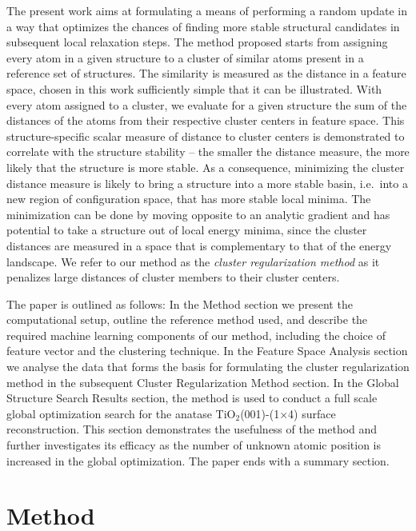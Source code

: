 \documentclass[aip,amsmath,amssymb,reprint]{revtex4-1}
\begin{document}
The present work aims at formulating a means of performing a random
update in a way that optimizes the chances of finding more stable
structural candidates in subsequent local relaxation steps. The method
proposed starts from assigning every atom in a given structure to a
cluster of similar atoms present in a reference set of structures.
The similarity is measured as the distance in a feature space, chosen in this work
sufficiently simple that it can be illustrated. With every atom
assigned to a cluster, we evaluate for a given structure the sum of
the distances of the atoms from their respective
cluster centers in feature space. This structure-specific scalar measure of distance to
cluster centers is demonstrated to correlate with the structure
stability -- the smaller the distance measure, the more likely that the
structure is more stable. As a consequence, minimizing the cluster distance measure
is likely to bring a structure into a more stable basin, i.e.\ into a new region of
configuration space, that has more stable local minima. The minimization
can be done by moving opposite to an analytic gradient and has
potential to take a structure out of local energy minima, since the
cluster distances are measured in a space that is complementary to that of the
energy landscape. We refer to our method as the
\textit{cluster regularization method} as it penalizes large
distances of cluster members to their cluster centers.

The paper is outlined as follows: In the Method section we present
the computational setup, outline the reference method used, and
describe the required machine learning components of our method,
including the choice of feature vector and the clustering technique.
In the Feature Space Analysis section we analyse the data that forms the basis for formulating the cluster
regularization method in the subsequent Cluster Regularization Method section. In the Global Structure Search Results
section, the method is used to conduct a full scale global optimization 
search for the anatase TiO$_2$(001)-(1$\times$4) surface
reconstruction.\cite{anatase2} This section demonstrates the usefulness of the method
and further investigates its efficacy as the number of unknown atomic
position is increased in the global optimization. The paper ends with a summary section.

\section{Method}
\end{document}
